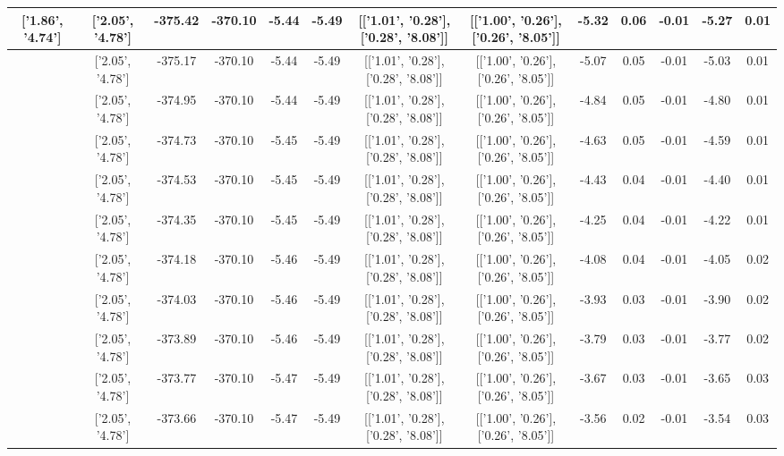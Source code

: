 \begin{table}[htbp]
\begin{adjustbox}{angle=90}
\begin{tabular}{|c|c|c|c|c|c|c|c|c|c|c|c|c|}
 ['1.86', '4.74'] & ['2.05', '4.78'] & -375.42 & -370.10 & -5.44 & -5.49 & [['1.01', '0.28'], ['0.28', '8.08']] & [['1.00', '0.26'], ['0.26', '8.05']] & -5.32 & 0.06 & -0.01 & -5.27 & 0.01\\ \hline
 ['1.87', '4.75'] & ['2.05', '4.78'] & -375.17 & -370.10 & -5.44 & -5.49 & [['1.01', '0.28'], ['0.28', '8.08']] & [['1.00', '0.26'], ['0.26', '8.05']] & -5.07 & 0.05 & -0.01 & -5.03 & 0.01\\ \hline
 ['1.88', '4.75'] & ['2.05', '4.78'] & -374.95 & -370.10 & -5.44 & -5.49 & [['1.01', '0.28'], ['0.28', '8.08']] & [['1.00', '0.26'], ['0.26', '8.05']] & -4.84 & 0.05 & -0.01 & -4.80 & 0.01\\ \hline
 ['1.89', '4.75'] & ['2.05', '4.78'] & -374.73 & -370.10 & -5.45 & -5.49 & [['1.01', '0.28'], ['0.28', '8.08']] & [['1.00', '0.26'], ['0.26', '8.05']] & -4.63 & 0.05 & -0.01 & -4.59 & 0.01\\ \hline
 ['1.91', '4.75'] & ['2.05', '4.78'] & -374.53 & -370.10 & -5.45 & -5.49 & [['1.01', '0.28'], ['0.28', '8.08']] & [['1.00', '0.26'], ['0.26', '8.05']] & -4.43 & 0.04 & -0.01 & -4.40 & 0.01\\ \hline
 ['1.92', '4.75'] & ['2.05', '4.78'] & -374.35 & -370.10 & -5.45 & -5.49 & [['1.01', '0.28'], ['0.28', '8.08']] & [['1.00', '0.26'], ['0.26', '8.05']] & -4.25 & 0.04 & -0.01 & -4.22 & 0.01\\ \hline
 ['1.93', '4.76'] & ['2.05', '4.78'] & -374.18 & -370.10 & -5.46 & -5.49 & [['1.01', '0.28'], ['0.28', '8.08']] & [['1.00', '0.26'], ['0.26', '8.05']] & -4.08 & 0.04 & -0.01 & -4.05 & 0.02\\ \hline
 ['1.94', '4.76'] & ['2.05', '4.78'] & -374.03 & -370.10 & -5.46 & -5.49 & [['1.01', '0.28'], ['0.28', '8.08']] & [['1.00', '0.26'], ['0.26', '8.05']] & -3.93 & 0.03 & -0.01 & -3.90 & 0.02\\ \hline
 ['1.95', '4.76'] & ['2.05', '4.78'] & -373.89 & -370.10 & -5.46 & -5.49 & [['1.01', '0.28'], ['0.28', '8.08']] & [['1.00', '0.26'], ['0.26', '8.05']] & -3.79 & 0.03 & -0.01 & -3.77 & 0.02\\ \hline
 ['1.96', '4.76'] & ['2.05', '4.78'] & -373.77 & -370.10 & -5.47 & -5.49 & [['1.01', '0.28'], ['0.28', '8.08']] & [['1.00', '0.26'], ['0.26', '8.05']] & -3.67 & 0.03 & -0.01 & -3.65 & 0.03\\ \hline
 ['1.97', '4.77'] & ['2.05', '4.78'] & -373.66 & -370.10 & -5.47 & -5.49 & [['1.01', '0.28'], ['0.28', '8.08']] & [['1.00', '0.26'], ['0.26', '8.05']] & -3.56 & 0.02 & -0.01 & -3.54 & 0.03\\ \hline

\end{tabular}
\end{adjustbox}
\end{table}
